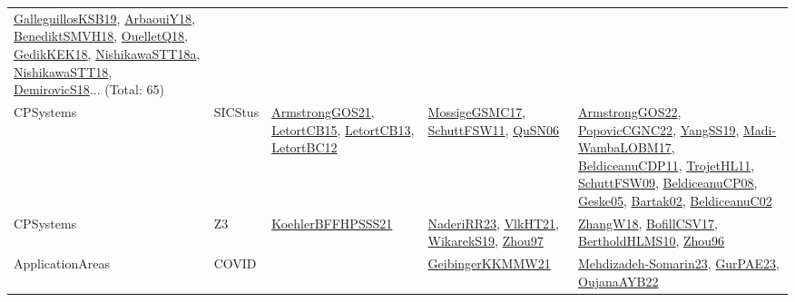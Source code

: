 {\begin{longtable}{lp{3cm}>{\raggedright}p{6cm}>{\raggedright}p{6cm}p{8cm}}
\href{papers/GalleguillosKSB19.pdf}{GalleguillosKSB19}\cite{GalleguillosKSB19}, \href{papers/ArbaouiY18.pdf}{ArbaouiY18}\cite{ArbaouiY18}, \href{papers/BenediktSMVH18.pdf}{BenediktSMVH18}\cite{BenediktSMVH18}, \href{papers/OuelletQ18.pdf}{OuelletQ18}\cite{OuelletQ18}, \href{articles/GedikKEK18.pdf}{GedikKEK18}\cite{GedikKEK18}, \href{papers/NishikawaSTT18a.pdf}{NishikawaSTT18a}\cite{NishikawaSTT18a}, \href{papers/NishikawaSTT18.pdf}{NishikawaSTT18}\cite{NishikawaSTT18}, \href{papers/DemirovicS18.pdf}{DemirovicS18}\cite{DemirovicS18}... (Total: 65)\\
CPSystems & SICStus & \href{papers/ArmstrongGOS21.pdf}{ArmstrongGOS21}\cite{ArmstrongGOS21}, \href{articles/LetortCB15.pdf}{LetortCB15}\cite{LetortCB15}, \href{papers/LetortCB13.pdf}{LetortCB13}\cite{LetortCB13}, \href{papers/LetortBC12.pdf}{LetortBC12}\cite{LetortBC12} & \href{papers/MossigeGSMC17.pdf}{MossigeGSMC17}\cite{MossigeGSMC17}, \href{articles/SchuttFSW11.pdf}{SchuttFSW11}\cite{SchuttFSW11}, \href{papers/QuSN06.pdf}{QuSN06}\cite{QuSN06} & \href{papers/ArmstrongGOS22.pdf}{ArmstrongGOS22}\cite{ArmstrongGOS22}, \href{papers/PopovicCGNC22.pdf}{PopovicCGNC22}\cite{PopovicCGNC22}, \href{papers/YangSS19.pdf}{YangSS19}\cite{YangSS19}, \href{papers/Madi-WambaLOBM17.pdf}{Madi-WambaLOBM17}\cite{Madi-WambaLOBM17}, \href{articles/BeldiceanuCDP11.pdf}{BeldiceanuCDP11}\cite{BeldiceanuCDP11}, \href{articles/TrojetHL11.pdf}{TrojetHL11}\cite{TrojetHL11}, \href{papers/SchuttFSW09.pdf}{SchuttFSW09}\cite{SchuttFSW09}, \href{papers/BeldiceanuCP08.pdf}{BeldiceanuCP08}\cite{BeldiceanuCP08}, \href{papers/Geske05.pdf}{Geske05}\cite{Geske05}, \href{papers/Bartak02.pdf}{Bartak02}\cite{Bartak02}, \href{papers/BeldiceanuC02.pdf}{BeldiceanuC02}\cite{BeldiceanuC02}\\
CPSystems & Z3 & \href{articles/KoehlerBFFHPSSS21.pdf}{KoehlerBFFHPSSS21}\cite{KoehlerBFFHPSSS21} & \href{articles/NaderiRR23.pdf}{NaderiRR23}\cite{NaderiRR23}, \href{articles/VlkHT21.pdf}{VlkHT21}\cite{VlkHT21}, \href{articles/WikarekS19.pdf}{WikarekS19}\cite{WikarekS19}, \href{articles/Zhou97.pdf}{Zhou97}\cite{Zhou97} & \href{articles/ZhangW18.pdf}{ZhangW18}\cite{ZhangW18}, \href{papers/BofillCSV17.pdf}{BofillCSV17}\cite{BofillCSV17}, \href{papers/BertholdHLMS10.pdf}{BertholdHLMS10}\cite{BertholdHLMS10}, \href{papers/Zhou96.pdf}{Zhou96}\cite{Zhou96}\\
ApplicationAreas & COVID &  & \href{papers/GeibingerKKMMW21.pdf}{GeibingerKKMMW21}\cite{GeibingerKKMMW21} & \href{papers/Mehdizadeh-Somarin23.pdf}{Mehdizadeh-Somarin23}\cite{Mehdizadeh-Somarin23}, \href{articles/GurPAE23.pdf}{GurPAE23}\cite{GurPAE23}, \href{papers/OujanaAYB22.pdf}{OujanaAYB22}\cite{OujanaAYB22}\\

\end{longtable}}
